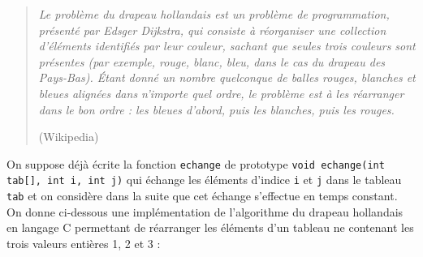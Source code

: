 \documentclass[11pt,a4paper]{article}
\begin{document}
\begin{Exercise}[title={Analyse d'un algorithme}]
	\begin{quote}
		\og{} \textit{Le problème du drapeau hollandais est un problème de programmation, présenté par Edsger Dijkstra, qui consiste à réorganiser une collection d'éléments identifiés par leur couleur, sachant que seules trois couleurs sont présentes (par exemple, rouge, blanc, bleu, dans le cas du drapeau des Pays-Bas).
			Étant donné un nombre quelconque de balles rouges, blanches et bleues alignées dans n'importe quel ordre, le problème est à les réarranger dans le bon ordre : les bleues d'abord, puis les blanches, puis les rouges.}\fg{}
		\begin{flushright}
			(Wikipedia)
		\end{flushright}
	\end{quote}
	On suppose déjà écrite la fonction {\tt echange} de prototype \texttt{void echange(int tab[], int i, int j)} qui échange les éléments d'indice {\tt i} et {\tt j} dans le tableau {\tt tab} et on considère dans la suite que cet échange s'effectue en temps constant. On donne ci-dessous une implémentation de  l'algorithme du drapeau hollandais en langage C permettant de réarranger les éléments d'un tableau ne contenant les trois valeurs entières 1, 2 et 3  :
\end{Exercise}
\end{document}
